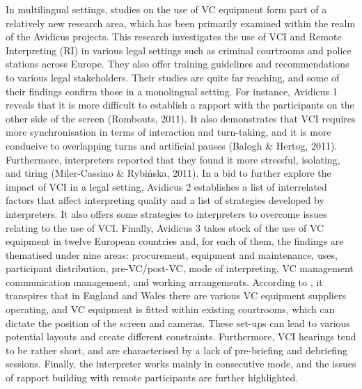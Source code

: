 \documentclass[output=paper]{langsci/langscibook}
\begin{document}
In multilingual settings, studies on the use of VC equipment form part of a relatively new research area, which has been primarily examined within the realm of the Avidicus projects. This research investigates the use of VCI and Remote Interpreting (RI) in various legal settings such as criminal courtrooms and police stations across Europe. They also offer training guidelines and recommendations to various legal stakeholders. Their studies are quite far reaching, and some of their findings confirm those in a monolingual setting. For instance, Avidicus 1 reveals that it is more difficult to establish a rapport with the participants on the other side of the screen (Rombouts, 2011). It also demonstrates that VCI requires more synchronisation in terms of interaction and turn-taking, and it is more conducive to overlapping turns and artificial pauses (Balogh \& Hertog, 2011). Furthermore, interpreters reported that they found it more stressful, isolating, and tiring (Miler-Cassino \& Rybińska, 2011). In a bid to further explore the impact of VCI in a legal setting, Avidicus 2 establishes a list of interrelated factors that affect interpreting quality and a list of strategies developed by interpreters. It also offers some strategies to interpreters to overcome issues relating to the use of VCI. Finally, Avidicus 3 takes stock of the use of VC equipment in twelve European countries and, for each of them, the findings are thematised under nine areas: procurement, equipment and maintenance, uses, participant distribution, pre-VC/post-VC, mode of interpreting, VC management communication management, and working arrangements. According to \citet{BraunEtAl2016}, it transpires that in England and Wales there are various VC equipment suppliers operating, and VC equipment is fitted within existing courtrooms, which can dictate the position of the screen and cameras. These set-ups can lead to various potential layouts and create different constraints. Furthermore, VCI hearings tend to be rather short, and are characterised by a lack of pre-briefing and debriefing sessions. Finally, the interpreter works mainly in consecutive mode, and the issues of rapport building with remote participants are further highlighted. 
\end{document}
